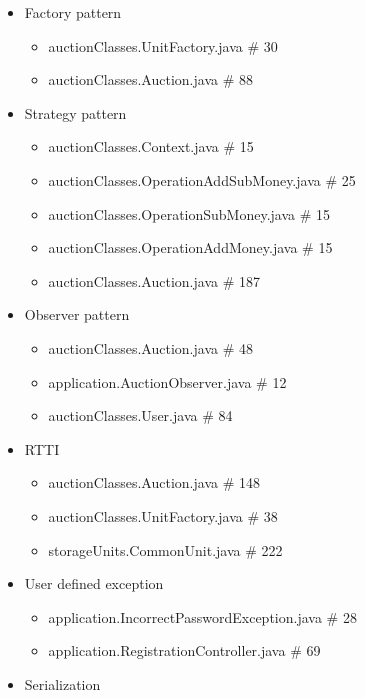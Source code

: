 \documentclass[
]{report}
\providecommand{\tightlist}{%
  \setlength{\itemsep}{0pt}\setlength{\parskip}{0pt}}
\begin{document}
\begin{itemize}
\tightlist
\item
  Factory pattern

  \begin{itemize}
  \tightlist
  \item
    auctionClasses.UnitFactory.java \# 30
  \item
    auctionClasses.Auction.java \# 88
  \end{itemize}
\item
  Strategy pattern

  \begin{itemize}
  \tightlist
  \item
    auctionClasses.Context.java \# 15
  \item
    auctionClasses.OperationAddSubMoney.java \# 25
  \item
    auctionClasses.OperationSubMoney.java \# 15
  \item
    auctionClasses.OperationAddMoney.java \# 15
  \item
    auctionClasses.Auction.java \# 187
  \end{itemize}
\item
  Observer pattern

  \begin{itemize}
  \tightlist
  \item
    auctionClasses.Auction.java \# 48
  \item
    application.AuctionObserver.java \# 12
  \item
    auctionClasses.User.java \# 84
  \end{itemize}
\item
  RTTI

  \begin{itemize}
  \tightlist
  \item
    auctionClasses.Auction.java \# 148
  \item
    auctionClasses.UnitFactory.java \# 38
  \item
    storageUnits.CommonUnit.java \# 222
  \end{itemize}
\item
  User defined exception

  \begin{itemize}
  \tightlist
  \item
    application.IncorrectPasswordException.java \# 28
  \item
    application.RegistrationController.java \# 69
  \end{itemize}
\item
  Serialization


\end{itemize}
\end{document}
